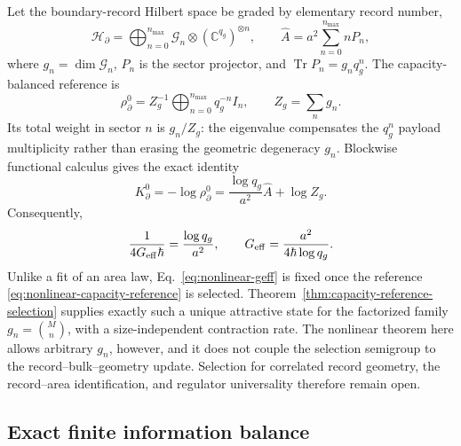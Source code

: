 Let the boundary-record Hilbert space be graded by elementary record number,
\begin{equation}
 \mathcal H_{\partial}
 =\bigoplus_{n=0}^{n_{\max}}
 \mathcal G_n\otimes(\mathbb C^{q_g})^{\otimes n},
 \qquad
 \widehat A=a^2\sum_{n=0}^{n_{\max}}nP_n ,
 \label{eq:nonlinear-graded-boundary}
\end{equation}
where \(g_n=\dim\mathcal G_n\), \(P_n\) is the sector projector, and
\(\operatorname{Tr}P_n=g_nq_g^n\).  The capacity-balanced reference is
\begin{equation}
 \rho_{\partial}^0
 =Z_g^{-1}\bigoplus_{n=0}^{n_{\max}}q_g^{-n}I_n,
 \qquad Z_g=\sum_n g_n .
 \label{eq:nonlinear-capacity-reference}
\end{equation}
Its total weight in sector \(n\) is \(g_n/Z_g\): the eigenvalue compensates
the \(q_g^n\) payload multiplicity rather than erasing the geometric
degeneracy \(g_n\).  Blockwise functional calculus gives the exact identity
\begin{equation}
 K_{\partial}^0=-\log\rho_{\partial}^0
 =\frac{\log q_g}{a^2}\widehat A+\log Z_g .
 \label{eq:nonlinear-capacity-modular}
\end{equation}
Consequently,
\begin{equation}
 \frac{1}{4G_{\rm eff}\hbar}=\frac{\log q_g}{a^2},
 \qquad
 G_{\rm eff}=\frac{a^2}{4\hbar\log q_g}.
 \label{eq:nonlinear-geff}
\end{equation}
Unlike a fit of an area law, Eq.~\eqref{eq:nonlinear-geff} is fixed once the
reference \eqref{eq:nonlinear-capacity-reference} is selected.
Theorem~\ref{thm:capacity-reference-selection} supplies exactly such a unique
attractive state for the factorized family
\(g_n=\binom{M}{n}\), with a size-independent contraction rate.  The
nonlinear theorem here allows arbitrary \(g_n\), however, and it does not
couple the selection semigroup to the record--bulk--geometry update.
Selection for correlated record geometry, the record--area identification,
and regulator universality therefore remain open.

\subsection{Exact finite information balance}

